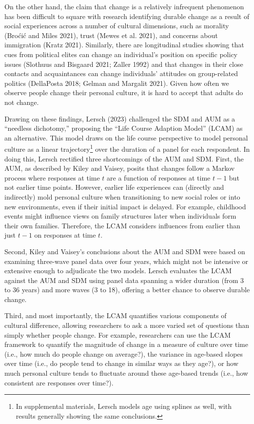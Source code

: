 \documentclass[
  11pt,
]{article}
\begin{document}
On the other hand, the claim that change is a relatively infrequent
phenomenon has been difficult to square with research identifying
durable change as a result of social experiences across a number of
cultural dimensions, such as morality (Broćić and Miles 2021), trust
(Mewes et al. 2021), and concerns about immigration (Kratz 2021).
Similarly, there are longitudinal studies showing that cues from
political elites can change an individual's position on specific policy
issues (Slothuus and Bisgaard 2021; Zaller 1992) and that changes in
their close contacts and acquaintances can change individuals' attitudes
on group-related politics (DellaPosta 2018; Gelman and Margalit 2021).
Given how often we observe people change their personal culture, it is
hard to accept that adults do not change.

Drawing on these findings, Lersch (2023) challenged the SDM and AUM as a
``needless dichotomy,'' proposing the ``Life Course Adaption Model''
(LCAM) as an alternative. This model draws on the life course
perspective to model personal culture as a linear trajectory\footnote{In
  supplemental materials, Lersch models age using splines as well, with
  results generally showing the same conclusions.} over the duration of
a panel for each respondent. In doing this, Lersch rectified three
shortcomings of the AUM and SDM. First, the AUM, as described by Kiley
and Vaisey, posits that changes follow a Markov process where responses
at time \(t\) are a function of responses at time \(t-1\) but not
earlier time points. However, earlier life experiences can (directly and
indirectly) mold personal culture when transitioning to new social roles
or into new environments, even if their initial impact is delayed. For
example, childhood events might influence views on family structures
later when individuals form their own families. Therefore, the LCAM
considers influences from earlier than just \(t-1\) on responses at time
\(t\).

Second, Kiley and Vaisey's conclusions about the AUM and SDM were based
on examining three-wave panel data over four years, which might not be
intensive or extensive enough to adjudicate the two models. Lersch
evaluates the LCAM against the AUM and SDM using panel data spanning a
wider duration (from 3 to 36 years) and more waves (3 to 18), offering a
better chance to observe durable change.

Third, and most importantly, the LCAM quantifies various components of
cultural difference, allowing researchers to ask a more varied set of
questions than simply whether people change. For example, researchers
can use the LCAM framework to quantify the magnitude of change in a
measure of culture over time (i.e., how much do people change on
average?), the variance in age-based slopes over time (i.e., do people
tend to change in similar ways as they age?), or how much personal
culture tends to fluctuate around these age-based trends (i.e., how
consistent are responses over time?).
\end{document}
